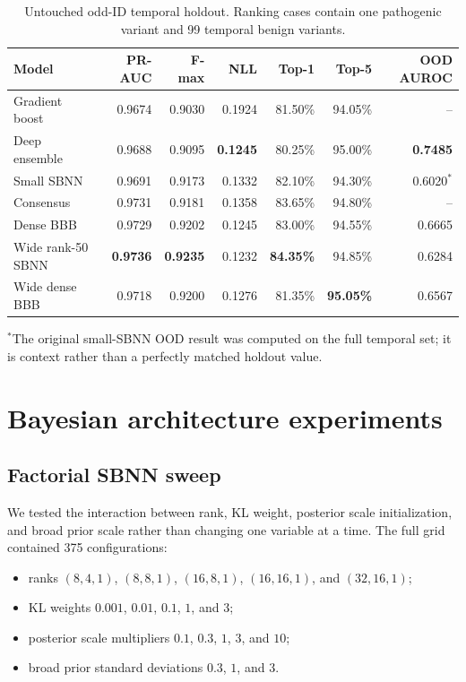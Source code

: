 \documentclass[11pt]{article}
\begin{document}
\begin{table}[H]
\centering
\caption{Untouched odd-ID temporal holdout. Ranking cases contain one pathogenic variant and 99 temporal benign variants.}
\small
\begin{tabular}{lrrrrrr}
\toprule
Model & PR-AUC & F-max & NLL & Top-1 & Top-5 & OOD AUROC \\
\midrule
Gradient boost & 0.9674 & 0.9030 & 0.1924 & 81.50\% & 94.05\% & -- \\
Deep ensemble & 0.9688 & 0.9095 & \textbf{0.1245} & 80.25\% & 95.00\% & \textbf{0.7485} \\
Small SBNN & 0.9691 & 0.9173 & 0.1332 & 82.10\% & 94.30\% & 0.6020$^*$ \\
Consensus & 0.9731 & 0.9181 & 0.1358 & 83.65\% & 94.80\% & -- \\
Dense BBB & 0.9729 & 0.9202 & 0.1245 & 83.00\% & 94.55\% & 0.6665 \\
Wide rank-50 SBNN & \textbf{0.9736} & \textbf{0.9235} & 0.1232 & \textbf{84.35\%} & 94.85\% & 0.6284 \\
Wide dense BBB & 0.9718 & 0.9200 & 0.1276 & 81.35\% & \textbf{95.05\%} & 0.6567 \\
\bottomrule
\end{tabular}
\begin{flushleft}\footnotesize $^*$The original small-SBNN OOD result was computed on the full temporal set; it is context rather than a perfectly matched holdout value.\end{flushleft}
\end{table}

\section{Bayesian architecture experiments}

\subsection{Factorial SBNN sweep}

We tested the interaction between rank, KL weight, posterior scale initialization, and broad prior scale rather than changing one variable at a time. The full grid contained 375 configurations:
\begin{itemize}
\item ranks $(8,4,1)$, $(8,8,1)$, $(16,8,1)$, $(16,16,1)$, and $(32,16,1)$;
\item KL weights $0.001$, $0.01$, $0.1$, $1$, and $3$;
\item posterior scale multipliers $0.1$, $0.3$, $1$, $3$, and $10$;
\item broad prior standard deviations $0.3$, $1$, and $3$.
\end{itemize}
\end{document}
